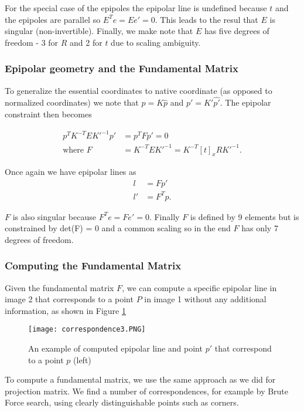 \documentclass[twoside]{article}
\begin{document}
For the special case of the epipoles the epipolar line is undefined because $t$ and the epipoles are parallel so $E^Te = Ee' = 0$. This leads to the resul that $E$ is singular (non-invertible). Finally, we make note that $E$ has five degrees of freedom - 3 for $R$ and 2 for $t$ due to scaling ambiguity.

\subsubsection{Epipolar geometry and the Fundamental Matrix \cite{FP}}

To generalize the essential coordinates to native coordinate (as opposed to normalized coordinates) we note that $p = K\hat{p}$ and $p' = K'\hat{p'}$. The epipolar constraint then becomes

\begin{align}
p^TK^{-T}EK'^{-1}p' &= p^T F p' = 0 \\
\text{where } F &= K^{-T}E K'^{-1} = K^{-T}[t]_x R K'^{-1}.
\end{align}

Once again we have epipolar lines as
\begin{align}
l &= Fp' \\
l' &= F^Tp.
\end{align}

$F$ is also singular because $F^Te = Fe' = 0$. Finally $F$ is defined by 9 elements but is constrained by det(F) = 0 and a common scaling so in the end $F$ has only 7 degrees of freedom.

\subsubsection{Computing the Fundamental Matrix}

Given the fundamental matrix $F$, we can compute a specific epipolar line in image 2 that corresponds to a point $P$ in image 1 without any additional information, as shown in Figure \ref{ex2}

\begin{figure}[h!]
  \begin{center}
	\texttt{[image: correspondence3.PNG]}  \end{center}
  \caption{An example of computed epipolar line and point $p'$ that correspond to a point $p$ (left)}
  \label{ex2}
\end{figure}

To compute a fundamental matrix, we use the same approach as we did for projection matrix. We find a number of correspondences, for example by Brute Force search, using clearly distinguishable points such as corners.
\end{document}
